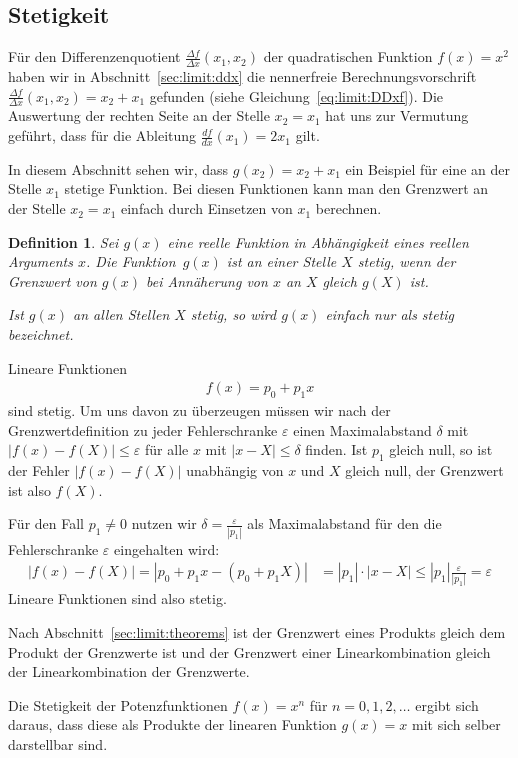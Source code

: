 \documentclass{article}
\let\eps\varepsilon
\def\ddx#1{\frac{d#1}{dx}}
\def\DDx#1{\frac{\Delta#1}{\Delta x}}
\newtheorem{Def}{Definition}
\begin{document}
\subsection{Stetigkeit}
\label{sec:limit:continuity}
Für den Differenzenquotient $\DDx f(x_1,x_2)$ der quadratischen
Funktion $f(x)=x^2$ haben wir in Abschnitt~\ref{sec:limit:ddx} die
nennerfreie Berechnungsvorschrift $\DDx f(x_1,x_2)=x_2+x_1$ gefunden
(siehe Gleichung~\eqref{eq:limit:DDxf}).  Die Auswertung der rechten
Seite an der Stelle $x_2=x_1$ hat uns zur Vermutung geführt, dass für
die Ableitung $\ddx f(x_1) = 2x_1$ gilt.

In diesem Abschnitt sehen wir, dass $g(x_2)=x_2+x_1$ ein Beispiel für
eine an der Stelle $x_1$ stetige Funktion. Bei diesen Funktionen kann
man den Grenzwert an der Stelle $x_2=x_1$ einfach durch Einsetzen von
$x_1$ berechnen.

\begin{Def}
  Sei $g(x)$ eine reelle Funktion in Abhängigkeit eines reellen
  Arguments $x$. Die Funktion~$g(x)$ ist an einer Stelle $X$ \emph{stetig},
  wenn der Grenzwert von $g(x)$ bei Annäherung von $x$ an $X$ gleich
  $g(X)$ ist.

  Ist $g(x)$ an allen Stellen $X$ stetig, so wird $g(x)$ einfach nur
  als stetig bezeichnet.
\end{Def}

Lineare Funktionen
\begin{align*}
  f(x) = p_0 + p_1 x
\end{align*}
sind stetig. Um uns davon zu überzeugen müssen wir nach der
Grenzwertdefinition zu jeder Fehlerschranke $\eps$ einen
Maximalabstand $\delta$ mit $|f(x)-f(X)|\leq \eps$ für alle $x$ mit
$|x-X|\leq \delta$ finden.
Ist $p_1$ gleich null, so ist der Fehler $|f(x)-f(X)|$ unabhängig von $x$ und $X$ gleich null, der Grenzwert ist also $f(X)$.

Für den Fall $p_1\neq 0$ nutzen wir $\delta =\frac{\eps}{|p_1|}$ als Maximalabstand für den die Fehlerschranke $\eps$ eingehalten wird:
\begin{align*}
  |f(x)-f(X)| = |p_0+p_1 x - (p_0+p_1X)| &= |p_1|\cdot|x-X|\leq |p_1|\frac{\eps}{|p_1|} = \eps
\end{align*}
Lineare Funktionen sind also stetig.

Nach Abschnitt~\ref{sec:limit:theorems} ist der Grenzwert eines Produkts
gleich dem Produkt der Grenzwerte ist und der Grenzwert einer
Linearkombination gleich der Linearkombination der Grenzwerte.

Die Stetigkeit der Potenzfunktionen $f(x)=x^n$ für $n=0,1,2,\ldots$
ergibt sich daraus, dass diese als Produkte der linearen Funktion
$g(x)=x$ mit sich selber darstellbar sind.
\end{document}
